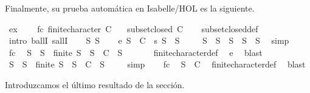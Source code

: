 \begin{isabellebody}
%
\begin{isamarkuptext}%
Finalmente, su prueba automática en Isabelle/HOL es la siguiente.%
\end{isamarkuptext}\isamarkuptrue%
\isamarkupfalse%
\ ex{}{\isacharcolon}\ \isanewline
\ \ \ fc{\isacharcolon}\ {\isachardoublequoteopen}finite{\isacharunderscore}character\ C{\isachardoublequoteclose}\isanewline
\ \ \ {\isachardoublequoteopen}subset{\isacharunderscore}closed\ C{\isachardoublequoteclose}\isanewline
%
\isadelimproof
\ \ %
\endisadelimproof
%
\isatagproof
{}\isamarkupfalse%
\ subset{\isacharunderscore}closed{\isacharunderscore}def\isanewline
{}\isamarkupfalse%
\ {\isacharparenleft}intro\ ballI\ sallI{\isacharparenright}\isanewline
\ \ \isamarkupfalse%
\ S{\isacharprime}\ S\isanewline
\ \ \isamarkupfalse%
\ e{\isacharcolon}\ {\isacartoucheopen}S\ {\isasymin}\ C{\isacartoucheclose}\ \ s{\isacharcolon}\ {\isacartoucheopen}S{\isacharprime}\ {\isasymsubseteq}\ S{\isacartoucheclose}\isanewline
\ \ \isamarkupfalse%
\ {\isacharasterisk}{\isacharcolon}\ {\isachardoublequoteopen}S{\isacharprime}{\isacharprime}\ {\isasymsubseteq}\ S{\isacharprime}\ {\isasymLongrightarrow}\ S{\isacharprime}{\isacharprime}\ {\isasymsubseteq}\ S{\isachardoublequoteclose}\ \ S{\isacharprime}{\isacharprime}\ \isamarkupfalse%
\ simp\isanewline
\ \ \isamarkupfalse%
\ fc\ \isamarkupfalse%
\ {\isachardoublequoteopen}S{\isacharprime}{\isacharprime}\ {\isasymsubseteq}\ S\ {\isasymLongrightarrow}\ finite\ S{\isacharprime}{\isacharprime}\ {\isasymLongrightarrow}\ S{\isacharprime}{\isacharprime}\ {\isasymin}\ C{\isachardoublequoteclose}\ \ S{\isacharprime}{\isacharprime}\ \isanewline
\ \ \ \ \isamarkupfalse%
\ finite{\isacharunderscore}character{\isacharunderscore}def\ \isamarkupfalse%
\ e\ \isamarkupfalse%
\ blast\isanewline
\ \ \isamarkupfalse%
\ {\isachardoublequoteopen}S{\isacharprime}{\isacharprime}\ {\isasymsubseteq}\ S{\isacharprime}\ {\isasymLongrightarrow}\ finite\ S{\isacharprime}{\isacharprime}\ {\isasymLongrightarrow}\ S{\isacharprime}{\isacharprime}\ {\isasymin}\ C{\isachardoublequoteclose}\ \ S{\isacharprime}{\isacharprime}\ \isamarkupfalse%
\ {\isacharasterisk}\ \isamarkupfalse%
\ simp\isanewline
\ \ \isamarkupfalse%
\ fc\ \isamarkupfalse%
\ {\isacartoucheopen}S{\isacharprime}\ {\isasymin}\ C{\isacartoucheclose}\ \isamarkupfalse%
\ finite{\isacharunderscore}character{\isacharunderscore}def\ \isamarkupfalse%
\ blast\isanewline
{}\isamarkupfalse%
%
\endisatagproof
{\isafoldproof}%
%
\isadelimproof
%
\endisadelimproof
%
\begin{isamarkuptext}%
Introduzcamos el último resultado de la sección.


\end{isamarkuptext}
\end{isabellebody}
